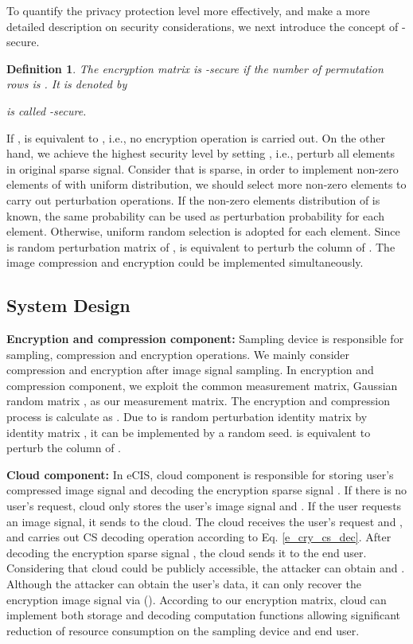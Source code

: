 \documentclass[conference]{IEEEtran}
\newtheorem{definition}{Definition}
\begin{document}
To quantify the privacy protection level more effectively, and make a more detailed description on security considerations,  we  next introduce the concept of -secure.
\begin{definition}
The encryption matrix  is -secure if the number of permutation rows is . It is denoted by

 is called -secure.
\end{definition}

If ,  is equivalent to , i.e., no encryption operation is carried out. On the other hand, we achieve the highest security level by setting  , i.e., perturb all elements in original sparse signal. Consider that  is sparse, in order to implement non-zero elements of  with uniform distribution, we should select more non-zero elements to carry out perturbation operations. If the non-zero elements distribution of  is known, the same probability can be used as perturbation probability for each element. Otherwise, uniform random selection is adopted for each element. 
Since  is random perturbation matrix of ,  is equivalent to perturb the column of . The image compression and encryption could be implemented simultaneously. 
\subsection{System Design}
\textbf{Encryption and compression component:}
Sampling device is responsible for sampling, compression and encryption operations. We mainly consider compression and encryption after image signal sampling. In encryption and compression component, we exploit the common measurement matrix, Gaussian random matrix , as our measurement matrix. The encryption and compression process is calculate as . Due to  is random perturbation identity matrix by identity matrix , it can be implemented by a random seed.  is equivalent to perturb the column of .

\textbf{Cloud component:}
In eCIS, cloud component is responsible for storing user's compressed image signal  and decoding the encryption sparse signal . If there is no user's request, cloud only stores the user's image signal   and . If the user requests an image signal, it sends  to the cloud. The cloud receives the user's request and , and carries out CS decoding operation according to Eq. \ref{e_cry_cs_dec}. After decoding the encryption sparse signal , the cloud sends it to the end user. Considering that cloud could be publicly accessible, the attacker can obtain  and . Although the attacker can obtain the user's data, it can only recover the encryption image signal via  ().
According to our encryption matrix, cloud can implement both storage and decoding computation functions allowing significant reduction of resource consumption on the sampling device and end user.
\end{document}
